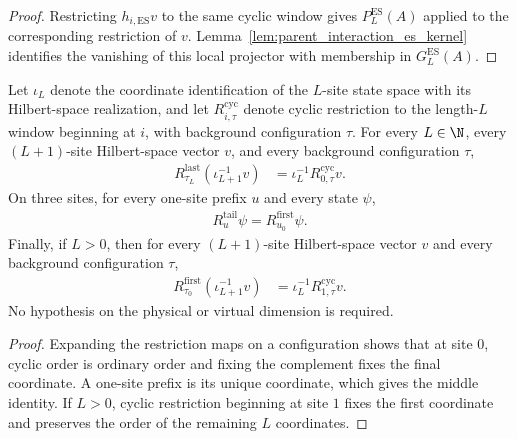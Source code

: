 \begin{proof}
    \leanok
    Restricting $h_{i,\mathrm{ES}}v$ to the same cyclic window gives
    $P_L^{\mathrm{ES}}(A)$ applied to the corresponding restriction of $v$.
    Lemma~\ref{lem:parent_interaction_es_kernel} identifies the vanishing of this
    local projector with membership in $G_L^{\mathrm{ES}}(A)$.
\end{proof}

\begin{lemma}
    \label{thm:adjacent_local_term_coordinate_identifications}
    \leanok
    Let $\iota_L$ denote the coordinate identification of the $L$-site state
    space with its Hilbert-space realization, and let
    $R^{\mathrm{cyc}}_{i,\tau}$ denote cyclic restriction to the length-$L$
    window beginning at $i$, with background configuration $\tau$. For every
    $L\in\N$, every $(L+1)$-site Hilbert-space vector $v$, and every background
    configuration $\tau$,
    \begin{align}
        R^{\mathrm{last}}_{\tau_L}(\iota_{L+1}^{-1}v)
         & =\iota_L^{-1}R^{\mathrm{cyc}}_{0,\tau}v.
    \end{align}
    On three sites, for every one-site prefix $u$ and every state $\psi$,
    \begin{align}
        R^{\mathrm{tail}}_u\psi=R^{\mathrm{first}}_{u_0}\psi.
    \end{align}
    Finally, if $L>0$, then for every $(L+1)$-site Hilbert-space vector $v$
    and every background configuration $\tau$,
    \begin{align}
        R^{\mathrm{first}}_{\tau_0}(\iota_{L+1}^{-1}v)
         & =\iota_L^{-1}R^{\mathrm{cyc}}_{1,\tau}v.
    \end{align}
    No hypothesis on the physical or virtual dimension is required.
\end{lemma}

\begin{proof}
    \leanok
    Expanding the restriction maps on a configuration shows that at site $0$,
    cyclic order is ordinary order and fixing the complement fixes the final
    coordinate. A one-site prefix is its unique coordinate, which gives the
    middle identity. If $L>0$, cyclic restriction beginning at site $1$ fixes
    the first coordinate and preserves the order of the remaining $L$
    coordinates.
\end{proof}

